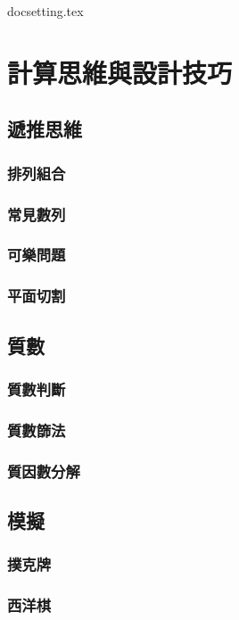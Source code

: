 \documentclass[12pt,a4paper,oneside]{article}
\begin{document}
\begin{CJK}{UTF8}{bkai}

{docsetting.tex}
\setcounter{section}{3}

\fi

\section{計算思維與設計技巧}

\subsection{遞推思維}

\subsubsection{排列組合}
\subsubsection{常見數列}
\subsubsection{可樂問題}
\subsubsection{平面切割}

\subsection{質數}

\subsubsection{質數判斷}
\subsubsection{質數篩法}
\subsubsection{質因數分解}

\subsection{模擬}

\subsubsection{撲克牌}
\subsubsection{西洋棋}

\ifx \allfiles \undefined

\printindex

\clearpage
\end{CJK}
\end{document}
